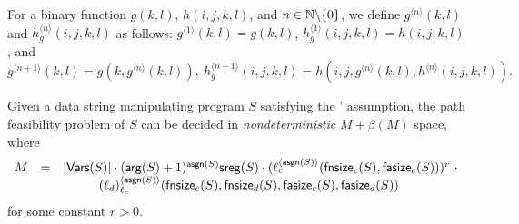 For a binary function $g(k, l)$, $h(i, j, k, l)$, and $n \in \mathbb{N} \backslash \{0\}$, we define $g^{\langle n \rangle}(k, l)$ and $h^{\langle n \rangle}_g(i, j, k, l)$ as follows: $g^{\langle 1 \rangle}( k, l) = g(k, l)$, $h^{\langle 1 \rangle}_g(i, j, k, l) = h(i, j, k, l)$, and 
$$g^{\langle n+1 \rangle}( k, l) = g(k, g^{\langle n \rangle}( k, l)), \ h^{\langle n+1 \rangle}_g (i, j, k, l) = h(i, j, g^{\langle n \rangle}(k, l), h^{\langle n \rangle}(i, j, k, l)).$$


\begin{theorem}\label{thm-generic-dec-symbolic}
	Given a data string manipulating program $S$ satisfying the \prerec{}' assumption, the path feasibility problem of $S$ can be decided in \emph{nondeterministic} $M+ \beta(M)$ space, where  
	\[
	\begin{array}{l c l}
		M & = & |\mathsf{Vars}(S)| \cdot (\mathsf{arg}(S)+1)^{\mathsf{asgn}(S)}  \mathsf{sreg}(S) \cdot  (\ell_c^{\langle \mathsf{asgn}(S) \rangle}(\mathsf{fnsize}_c(S), \mathsf{fasize}_c(S)))^{r}\ \cdot \\
		& &  \hspace{1cm} (\ell_d)^{\langle  \mathsf{asgn}(S) \rangle}_{\ell_c}(\mathsf{fnsize}_c(S),\mathsf{fnsize}_d(S),  \mathsf{fasize}_c(S), \mathsf{fasize}_d(S))
\end{array}
	\]
for some constant $r > 0$. 
\end{theorem}




